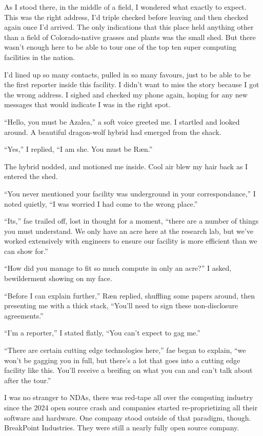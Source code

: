 As I stood there, in the middle of a field, I wondered what exactly to expect.  This was the right address, I'd triple checked before leaving and then checked again once I'd arrived.  The only indications that this place held anything other than a field of Colorado-native grasses and plants was the small shed.  But there wasn't enough here to be able to tour one of the top ten super computing facilities in the nation.

I'd lined up so many contacts, pulled in so many favours, just to be able to be the first reporter inside this facility.  I didn't want to miss the story because I got the wrong address.  I sighed and checked my phone again, hoping for any new messages that would indicate I was in the right spot.

``Hello, you must be Azalea,'' a soft voice greeted me.  I startled and looked around.  A beautiful dragon-wolf hybrid had emerged from the shack.

``Yes,'' I replied, ``I am she.  You must be Ræn.''

The hybrid nodded, and motioned me inside.  Cool air blew my hair back as I entered the shed.

``You never mentioned your facility was underground in your correspondance,'' I noted quietly, ``I was worried I had come to the wrong place.''

``Its,'' fae trailed off, lost in thought for a moment, ``there are a number of things you must understand.  We only have an acre here at the research lab, but we've worked extensively with engineers to ensure our facility is more efficient than we can show for.''

``How did you manage to fit so much compute in only an acre?'' I asked, bewilderment showing on my face.

``Before I can explain further,'' Ræn replied, shuffling some papers around, then presenting me with a thick stack, ``You'll need to sign these non-disclosure agreements.''

``I'm a reporter,'' I stated flatly, ``You can't expect to gag me.''

``There are certain cutting edge technologies here,'' fae began to explain, ``we won't be gagging you in full, but there's a lot that goes into a cutting edge facility like this.  You'll receive a breifing on what you can and can't talk about after the tour.''

I was no stranger to NDAs, there was red-tape all over the computing industry since the 2024 open source crash and companies started re-proprietizing all their software and hardware.  One company stood outside of that paradigm, though.  BreakPoint Industries.  They were still a nearly fully open source company.

